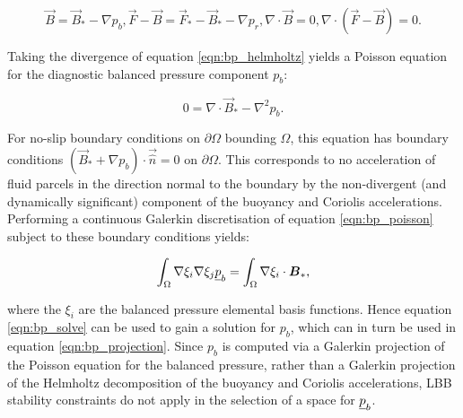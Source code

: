\begin{subequations}
  \begin{equation}\label{eqn:bp_helmholtz}
    \vec{B} = \vec{B}_* - \nabla p_b,
  \end{equation}
  \begin{equation}
    \vec{F} - \vec{B} = \vec{F}_* - \vec{B}_* - \nabla p_r,
  \end{equation}
  \begin{equation}
    \nabla \cdot \vec{B} = 0,
  \end{equation}
  \begin{equation}
    \nabla \cdot \left( \vec{F} - \vec{B} \right) = 0.
  \end{equation}
\end{subequations}

Taking the divergence of equation \eqref{eqn:bp_helmholtz} yields a Poisson equation for the diagnostic
balanced pressure component $p_b$:

\begin{equation}\label{eqn:bp_poisson}
  0 = \nabla \cdot \vec{B}_* - \nabla^2 p_b.
\end{equation}

For no-slip boundary conditions on $\partial \Omega$ bounding
$\Omega$, this equation has boundary conditions \linebreak
$\left( \vec{B}_* + \nabla p_b \right) \cdot \vec{\hat{n}} = 0$ on $\partial \Omega$. This corresponds
to no acceleration of fluid parcels in the direction normal to the boundary
by the non-divergent (and dynamically significant) component of the buoyancy
and Coriolis accelerations. Performing a continuous Galerkin discretisation of equation
\eqref{eqn:bp_poisson} subject to these boundary conditions yields:

\begin{equation}\label{eqn:bp_solve}
  \int_\Omega \nabla \xi_i \nabla \xi_j \underline{p}_b = \int_\Omega \nabla \xi_i \cdot {\mbox{\boldmath$B$}}_*,
\end{equation}

where the $\xi_i$ are the balanced pressure elemental basis functions. Hence equation
\eqref{eqn:bp_solve} can be used to gain a solution for $p_b$, which can in turn
be used in equation \eqref{eqn:bp_projection}. Since $p_b$ is computed via
a Galerkin projection of the Poisson equation for the balanced pressure,
rather than a Galerkin projection of the Helmholtz decomposition of the buoyancy
and Coriolis accelerations, LBB stability constraints do not apply in the selection
of a space for $\underline{p}_b$.


